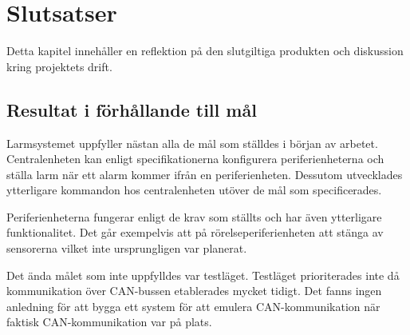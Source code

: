 \documentclass[a4paper]{article}
\begin{document}

\section{Slutsatser}
Detta kapitel innehåller en reflektion på den slutgiltiga produkten och diskussion kring projektets drift.

\subsection{Resultat i förhållande till mål}

Larmsystemet uppfyller nästan alla de mål som ställdes i början av arbetet.
Centralenheten kan enligt specifikationerna konfigurera periferienheterna och ställa larm när ett alarm kommer ifrån en periferienheten.
Dessutom utvecklades ytterligare kommandon hos centralenheten utöver de mål som specificerades.

Periferienheterna fungerar enligt de krav som ställts och har även ytterligare funktionalitet.
Det går exempelvis att på rörelseperiferienheten att stänga av sensorerna vilket inte ursprungligen var planerat. 

Det ända målet som inte uppfylldes var testläget. 
Testläget prioriterades inte då kommunikation över CAN-bussen etablerades mycket tidigt. 
Det fanns ingen anledning för att bygga ett system för att emulera CAN-kommunikation när faktisk CAN-kommunikation var på plats.
\end{document}

